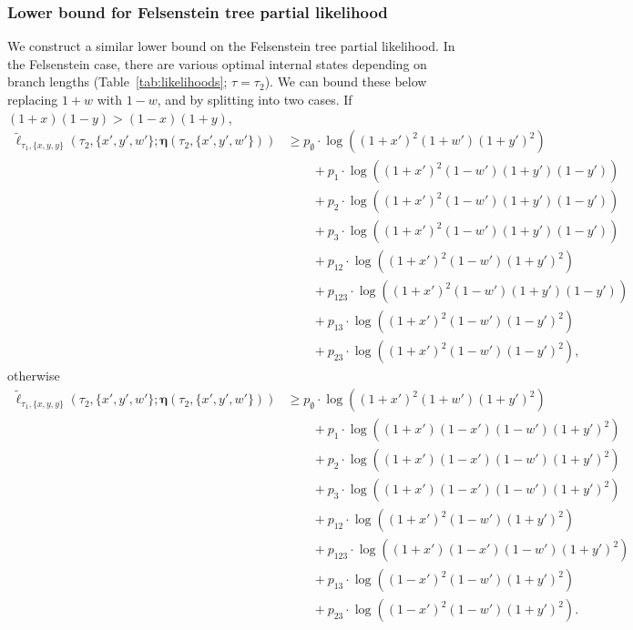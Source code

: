 \documentclass{article}
\newcommand{\fullAncestralSplitPartitions}{\boldsymbol\eta}
\begin{document}
\subsubsection{Lower bound for Felsenstein tree partial likelihood}

We construct a similar lower bound on the Felsenstein tree partial likelihood.
In the Felsenstein case, there are various optimal internal states depending on branch lengths (Table~\ref{tab:likelihoods}; $\tau = \tau_2$).
We can bound these below replacing $1+w$ with $1-w$, and by splitting into two cases.
If $(1+x)(1-y) > (1-x)(1+y)$,
\begin{align*}
    \tilde{\ell}_{\tau_1,\{x,y,y\}}(\tau_2, \{x',y',w'\}; \fullAncestralSplitPartitions(\tau_2,\{x',y',w'\}))
    &\ge      p_{\emptyset}  \cdot\log((1+x')^2   (1+w')(1+y')^2) \\
    &\qquad + p_{1}          \cdot\log((1+x')^2   (1-w')(1+y')(1-y')) \\
    &\qquad + p_{2}          \cdot\log((1+x')^2   (1-w')(1+y')(1-y')) \\
    &\qquad + p_{3}          \cdot\log((1+x')^2   (1-w')(1+y')(1-y')) \\
    &\qquad + p_{12}         \cdot\log((1+x')^2   (1-w')(1+y')^2) \\
    &\qquad + p_{123}        \cdot\log((1+x')^2   (1-w')(1+y')(1-y'))\\
    &\qquad + p_{13}         \cdot\log((1+x')^2   (1-w')(1-y')^2) \\
    &\qquad + p_{23}         \cdot\log((1+x')^2   (1-w')(1-y')^2),
\end{align*}
otherwise
\begin{align*}
    \tilde{\ell}_{\tau_1,\{x,y,y\}}(\tau_2, \{x',y',w'\}; \fullAncestralSplitPartitions(\tau_2,\{x',y',w'\}))
    &\ge      p_{\emptyset}  \cdot\log((1+x')^2    (1+w')(1+y')^2) \\
    &\qquad + p_{1}          \cdot\log((1+x')(1-x')(1-w')(1+y')^2) \\
    &\qquad + p_{2}          \cdot\log((1+x')(1-x')(1-w')(1+y')^2) \\
    &\qquad + p_{3}          \cdot\log((1+x')(1-x')(1-w')(1+y')^2) \\
    &\qquad + p_{12}         \cdot\log((1+x')^2    (1-w')(1+y')^2) \\
    &\qquad + p_{123}        \cdot\log((1+x')(1-x')(1-w')(1+y')^2)\\
    &\qquad + p_{13}         \cdot\log((1-x')^2    (1-w')(1+y')^2) \\
    &\qquad + p_{23}         \cdot\log((1-x')^2    (1-w')(1+y')^2).
\end{align*}
\end{document}
